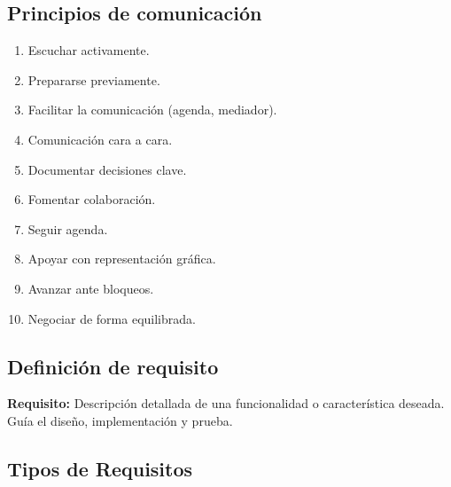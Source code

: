     \subsection{Principios de comunicación}\label{subsec:principios-de-comunicacion}

    \begin{enumerate}

        \item Escuchar activamente.

        \item Prepararse previamente.

        \item Facilitar la comunicación (agenda, mediador).

        \item Comunicación cara a cara.

        \item Documentar decisiones clave.

        \item Fomentar colaboración.

        \item Seguir agenda.

        \item Apoyar con representación gráfica.

        \item Avanzar ante bloqueos.

        \item Negociar de forma equilibrada.

    \end{enumerate}

    \subsection{Definición de requisito}\label{subsec:definicion-de-requisito}

    \begin{definicion}

        \textbf{Requisito:} Descripción detallada de una funcionalidad o característica deseada.
        Guía el diseño, implementación y prueba.

    \end{definicion}

    \subsection{Tipos de Requisitos}\label{subsec:tipos-de-requisitos}

